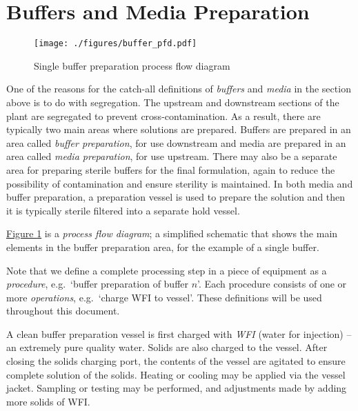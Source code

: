 \section{Buffers and Media Preparation}\label{SS.buffmedprep}
\begin{figure}
    \centering
    \texttt{[image: ./figures/buffer\_pfd.pdf]}
    \caption{Single buffer preparation process flow diagram}
    \label{fig.pfd}
\end{figure}
One of the reasons for the catch-all definitions of \emph{buffers} and
\emph{media} in the section above is to do with segregation.
The upstream and downstream sections of the plant are segregated to prevent
cross-contamination.
As a result, there are typically two main areas where solutions are prepared.
Buffers are prepared in an area called \emph{buffer preparation}, for use
downstream and media are prepared in an area called \emph{media preparation},
for use upstream.
There may also be a separate area for preparing sterile buffers for the final
formulation, again to reduce the possibility of contamination and ensure
sterility is maintained.
In both media and buffer preparation, a preparation vessel is used to prepare
the solution and then it is typically sterile filtered into a separate hold
vessel.

\hyperref[fig.pfd]{Figure \ref*{fig.pfd}} is a \emph{process flow diagram}; a
simplified schematic that shows the main elements in the buffer preparation
area, for the example of a single buffer.

Note that we define a complete processing step in a piece of equipment as a
\emph{procedure}, e.g.\ `buffer preparation of buffer $n$'.
Each procedure consists of one or more \emph{operations}, e.g.\ `charge WFI
to vessel'.
These definitions will be used throughout this document. 

A clean buffer preparation vessel is first charged with \emph{WFI} (water for
injection) -- an extremely pure quality water.
Solids are also charged to the vessel.
After closing the solids charging port, the contents of the vessel are
agitated to ensure complete solution of the solids.
Heating or cooling may be applied via the vessel jacket.
Sampling or testing may be performed, and adjustments made by adding more 
solids of WFI.

